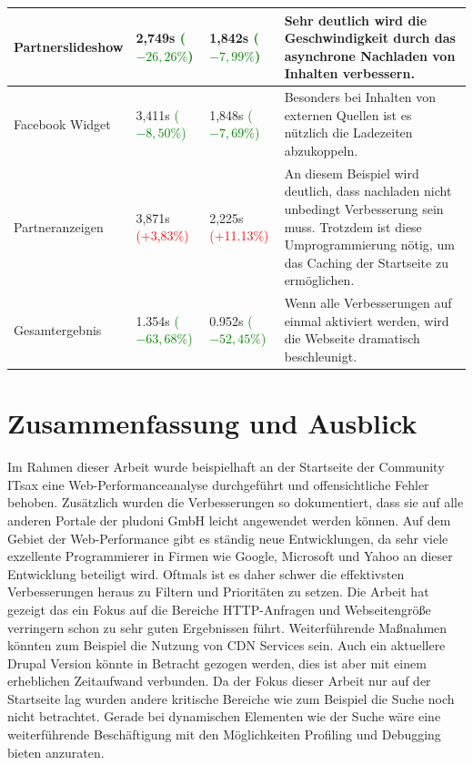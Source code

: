 \begin{center}
\begin{longtable}{ | p{3cm} | p{1.5cm} | p{1.5cm} | p{6cm} |}
    Partnerslideshow 			& 2,749s \textcolor{green}{($-26,26\%$)}  	& 1,842s \textcolor{green}{($-7,99\%$)}& Sehr deutlich wird die Geschwindigkeit durch das asynchrone Nachladen von Inhalten verbessern.  \\ \hline
    Facebook Widget 			& 3,411s \textcolor{green}{($-8,50\%$)} 	& 1,848s \textcolor{green}{($-7,69\%$)}& Besonders bei Inhalten von externen Quellen ist es nützlich die Ladezeiten abzukoppeln.  \\ \hline
    Partneranzeigen 			& 3,871s \textcolor{red}{(+3,83\%)} 		& 2,225s \textcolor{red}{(+11.13\%)}& An diesem Beispiel wird deutlich, dass nachladen nicht unbedingt Verbesserung sein muss. Trotzdem ist diese Umprogrammierung nötig, um das Caching der Startseite zu ermöglichen.  \\ \hline
    \hline 
    \hline
    Gesamtergebnis 			& 1.354s \textcolor{green}{($-63,68\%$)} & 0.952s \textcolor{green}{($-52,45\%$)} & Wenn alle Verbesserungen auf einmal aktiviert werden, wird die Webseite dramatisch beschleunigt.  \\ \hline
    
    \hline
    \end{longtable}
\end{center}


\section{Zusammenfassung und Ausblick}
Im Rahmen dieser Arbeit wurde beispielhaft an der Startseite der Community ITsax eine Web-Performanceanalyse durchgef\"uhrt und offensichtliche Fehler behoben. Zus\"atzlich wurden die Verbesserungen so dokumentiert, dass sie auf alle anderen Portale der pludoni GmbH leicht angewendet werden k\"onnen. Auf dem Gebiet der Web-Performance gibt es st\"andig neue Entwicklungen, da sehr viele exzellente Programmierer in Firmen wie Google, Microsoft und Yahoo an dieser Entwicklung beteiligt wird. Oftmals ist es daher schwer die effektivsten Verbesserungen heraus zu Filtern und Priorit\"aten zu setzen. Die Arbeit hat gezeigt das ein Fokus auf die Bereiche HTTP-Anfragen und Webseitengr\"o\ss{}e verringern schon zu sehr guten Ergebnissen f\"uhrt. Weiterf\"uhrende Ma\ss{}nahmen k\"onnten zum Beispiel die Nutzung von CDN Services sein. Auch ein aktuellere Drupal Version k\"onnte in Betracht gezogen werden, dies ist aber mit einem erheblichen Zeitaufwand verbunden. 
Da der Fokus dieser Arbeit nur auf der Startseite lag wurden andere kritische Bereiche wie zum Beispiel die Suche noch nicht betrachtet. Gerade bei dynamischen Elementen wie der Suche w\"are eine weiterf\"uhrende Besch\"aftigung mit den M\"oglichkeiten Profiling und Debugging bieten anzuraten.


